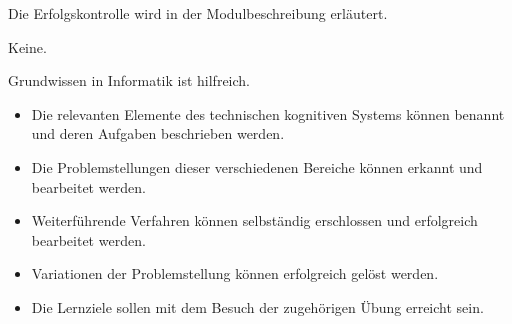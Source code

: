 \begin{course}

\setdoclanguagegerman
{}



\coursehead


\label{cour_7113.dp_997}


\begin{styleenv}
\begin{assessment}
Die Erfolgskontrolle wird in der Modulbeschreibung erläutert.


\end{assessment}

\begin{conditions}Keine.\end{conditions}

\begin{recommendations}Grundwissen in Informatik ist hilfreich.

\end{recommendations}
\end{styleenv}

\begin{learningoutcomes}
\begin{itemize}\item Die relevanten Elemente des technischen kognitiven Systems können benannt und deren Aufgaben beschrieben werden.  \item Die Problemstellungen dieser verschiedenen Bereiche können erkannt und bearbeitet werden.  \item Weiterführende Verfahren können selbständig erschlossen und erfolgreich bearbeitet werden.  \item Variationen der Problemstellung können erfolgreich gelöst werden.  \item Die Lernziele sollen mit dem Besuch der zugehörigen Übung erreicht sein.  \end{itemize}
\end{learningoutcomes}


\end{course}
